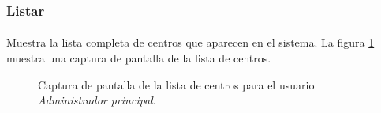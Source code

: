 \subsubsection{Listar}

  \paragraph{}Muestra la lista completa de centros que aparecen en el sistema.
  La figura \ref{capturaPantallaListaCentrosAdminPrincipal} muestra una captura
  de pantalla de la lista de centros.

  \begin{figure}[!ht]
    \begin{center}
      \caption{Captura de pantalla de la lista de centros para el usuario \textit{Administrador principal}.}
      \label{capturaPantallaListaCentrosAdminPrincipal}
    \end{center}
  \end{figure}
